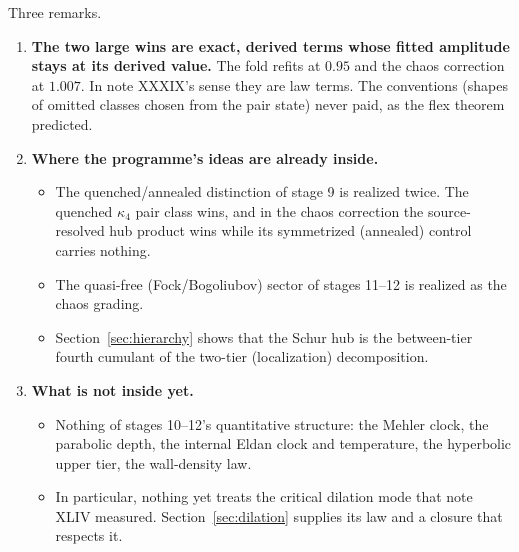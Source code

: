 Three remarks.
\begin{enumerate}[leftmargin=*]
\item \textbf{The two large wins are exact, derived terms whose fitted amplitude stays at its derived value.} The fold refits at $0.95$
and the chaos correction at $1.007$. In note XXXIX's sense they are law terms. The conventions (shapes of omitted classes chosen from
the pair state) never paid, as the flex theorem predicted.
\item \textbf{Where the programme's ideas are already inside.}
\begin{itemize}
\item The quenched/annealed distinction of stage 9 is realized twice. The quenched $\kappa_4$ pair class wins, and in the chaos
correction the source-resolved hub product wins while its symmetrized (annealed) control carries nothing.
\item The quasi-free (Fock/Bogoliubov) sector of stages 11--12 is realized as the chaos grading.
\item Section~\ref{sec:hierarchy} shows that the Schur hub is the between-tier fourth cumulant of the two-tier (localization)
decomposition.
\end{itemize}
\item \textbf{What is not inside yet.}
\begin{itemize}
\item Nothing of stages 10--12's quantitative structure: the Mehler clock, the parabolic depth, the internal Eldan clock and
temperature, the hyperbolic upper tier, the wall-density law.
\item In particular, nothing yet treats the critical dilation mode that note XLIV measured. Section~\ref{sec:dilation} supplies its law
and a closure that respects it.
\end{itemize}
\end{enumerate}
